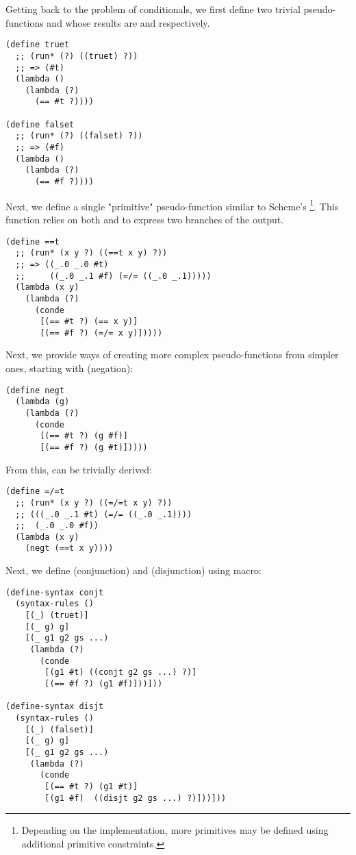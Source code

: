 Getting back to the problem of conditionals, we first define two trivial pseudo-functions  and  whose results are  and  respectively.

\begin{lstlisting}
(define truet
  ;; (run* (?) ((truet) ?))
  ;; => (#t)
  (lambda ()
    (lambda (?)
      (== #t ?))))

(define falset
  ;; (run* (?) ((falset) ?))
  ;; => (#f)
  (lambda ()
    (lambda (?)
      (== #f ?))))
\end{lstlisting}

Next, we define a single "primitive" pseudo-function similar to Scheme's \footnote{Depending on the implementation, more primitives may be defined using additional primitive constraints.}. This function relies on both \code{==} and \code{=/=} to express two branches of the output.
\begin{lstlisting}
(define ==t
  ;; (run* (x y ?) ((==t x y) ?))
  ;; => ((_.0 _.0 #t)
  ;;     ((_.0 _.1 #f) (=/= ((_.0 _.1)))))
  (lambda (x y)
    (lambda (?)
      (conde
       [(== #t ?) (== x y)]
       [(== #f ?) (=/= x y)]))))
\end{lstlisting}

Next, we provide ways of creating more complex pseudo-functions from simpler ones, starting with  (negation):
\begin{lstlisting}
(define negt
  (lambda (g)
    (lambda (?)
      (conde
       [(== #t ?) (g #f)]
       [(== #f ?) (g #t)]))))
\end{lstlisting}

From this,  can be trivially derived:
\begin{lstlisting}
(define =/=t
  ;; (run* (x y ?) ((=/=t x y) ?))
  ;; (((_.0 _.1 #t) (=/= ((_.0 _.1))))
  ;;  (_.0 _.0 #f))
  (lambda (x y)
    (negt (==t x y))))
\end{lstlisting}

Next, we define  (conjunction) and  (disjunction) using macro:
\begin{lstlisting}
(define-syntax conjt
  (syntax-rules ()
    [(_) (truet)]
    [(_ g) g]
    [(_ g1 g2 gs ...)
     (lambda (?)
       (conde
        [(g1 #t) ((conjt g2 gs ...) ?)]
        [(== #f ?) (g1 #f)]))]))

(define-syntax disjt
  (syntax-rules ()
    [(_) (falset)]
    [(_ g) g]
    [(_ g1 g2 gs ...)
     (lambda (?)
       (conde
        [(== #t ?) (g1 #t)]
        [(g1 #f)  ((disjt g2 gs ...) ?)]))]))
\end{lstlisting}


